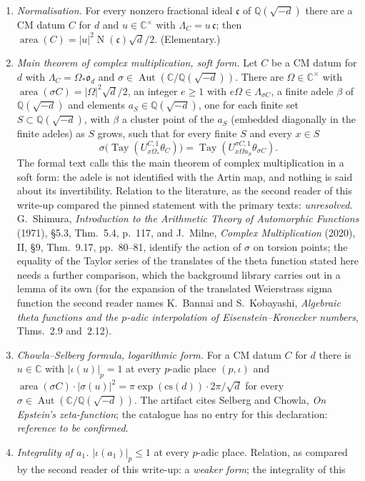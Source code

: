 \documentclass[11pt,a4paper]{article}
\newcommand{\Q}{\mathbb{Q}}
\theoremstyle{plainx}
\theoremstyle{uprightx}
\newcommand{\CC}{\mathbb{C}}
\newcommand{\np}[1]{|#1|_p}
\newcommand{\Aut}{\operatorname{Aut}}
\newcommand{\Nm}{\operatorname{N}}
\newcommand{\OO}{\mathfrak{o}}
\newcommand{\LamC}[1]{\Lambda_{#1}}
\newcommand{\thC}[1]{\theta_{#1}}
\newcommand{\UC}[3]{U^{#1,#2}_{#3}}
\newcommand{\tay}[1]{\operatorname{Tay}(#1)}
\newcommand{\area}[1]{\operatorname{area}(#1)}
\begin{document}
\begin{enumerate}[label=\textup{(Q\arabic*)},leftmargin=3.1em,itemsep=2pt]
\item \emph{Normalisation.} For every nonzero fractional ideal $\mathfrak{c}$ of $\Q(\sqrt{-d})$ there are a CM
datum $C$ for $d$ and $u\in\CC^\times$ with $\LamC{C}=u\,\mathfrak{c}$; then $\area{C}=|u|^2\Nm(\mathfrak c)\sqrt d/2$.
(Elementary.)
\item \emph{Main theorem of complex multiplication, soft form.} Let $C$ be a CM datum for $d$ with
$\LamC{C}=\Omega_\ast\OO_d$ and $\sigma\in\Aut(\CC/\Q(\sqrt{-d}))$. There are $\Omega\in\CC^\times$ with
$\area{\sigma C}=|\Omega|^2\sqrt d/2$, an integer $e\ge1$ with $e\Omega\in\LamC{\sigma C}$, a finite adele $\beta$ of
$\Q(\sqrt{-d})$ and elements $a_S\in\Q(\sqrt{-d})$, one for each finite set $S\subset\Q(\sqrt{-d})$, with $\beta$ a
cluster point of the $a_S$ (embedded diagonally in the finite adeles) as $S$ grows, such that for every finite $S$ and every $x\in S$
\[\sigma\bigl(\tay{\UC{C}{1}{x\Omega_\ast}\thC{C}}\bigr)=\tay{\UC{\sigma C}{1}{x\Omega a_S}\thC{\sigma C}} .\]
The formal text calls this the main theorem of complex multiplication in a soft form: the adele is not identified
with the Artin map, and nothing is said about its invertibility. Relation to the literature, as the second reader
of this write-up compared the pinned statement with the primary texts: \emph{unresolved}. G.~Shimura,
\emph{Introduction to the Arithmetic Theory of Automorphic Functions} (1971), \S5.3, Thm.~5.4, p.~117, and
J.~Milne, \emph{Complex Multiplication} (2020), II, \S9, Thm.~9.17, pp.~80--81, identify the action of $\sigma$ on
torsion points; the equality of the Taylor series of the translates of the theta function stated here needs a
further comparison, which the background library carries out in a lemma of its own (for the expansion of the
translated Weierstrass sigma function the second reader names K.~Bannai and S.~Kobayashi, \emph{Algebraic theta
functions and the $p$-adic interpolation of Eisenstein--Kronecker numbers}, Thms.~2.9 and~2.12).
\item \emph{Chowla--Selberg formula, logarithmic form.} For a CM datum $C$ for $d$ there is $u\in\CC$ with
$\np{\iota(u)}=1$ at every $p$-adic place $(p,\iota)$ and
$\area{\sigma C}\cdot|\sigma(u)|^2=\pi\exp(\mathrm{cs}(d))\cdot2\pi/\sqrt d$ for every
$\sigma\in\Aut(\CC/\Q(\sqrt{-d}))$. The
artifact cites Selberg and Chowla, \emph{On Epstein's zeta-function}; the catalogue has no entry for this
declaration: \emph{reference to be confirmed}.
\item \emph{Integrality of $a_1$.} $\np{\iota(a_1)}\le1$ at every $p$-adic place. Relation, as compared by the second reader of this write-up: a \emph{weaker form}; the integrality of this

\end{enumerate}
\end{document}
